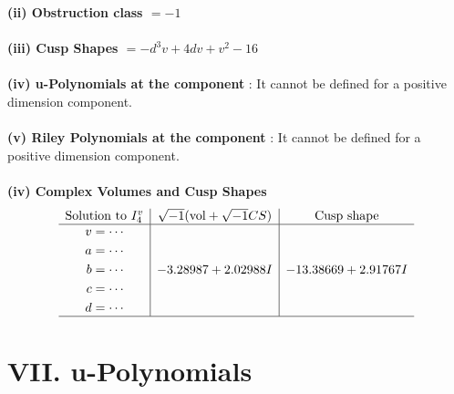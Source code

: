 \documentclass[1p]{elsarticle_modified}
\theoremstyle{definition}
\newcommand{\I}{\sqrt{-1}}
\begin{document}
\flushleft \textbf{(ii) Obstruction class $= -1$}\\~\\
\flushleft \textbf{(iii) Cusp Shapes $= - d^3 v+4 d v+v^2-16$}\\~\\
\flushleft \textbf{(iv) u-Polynomials at the component} : It cannot be defined for a positive dimension component.\\~\\
\flushleft \textbf{(v) Riley Polynomials at the component} : It cannot be defined for a positive dimension component.\\~\\
\newpage\flushleft \textbf{(iv) Complex Volumes and Cusp Shapes}
$$\begin{array}{c|c|c} 
\text{Solution to }I^v_{4}& \I (\text{vol} + \sqrt{-1}CS) & \text{Cusp shape}\\
 \hline 
\begin{aligned}
v &= \cdots \\
a &= \cdots \\
b &= \cdots \\
c &= \cdots \\
d &= \cdots\end{aligned}
 & -3.28987 + 2.02988 I & -13.38669 + 2.91767 I\\
 \hline 
 \end{array}
$$
\newpage\renewcommand{\arraystretch}{1}
\centering \section*{ VII. u-Polynomials}
\end{document}
